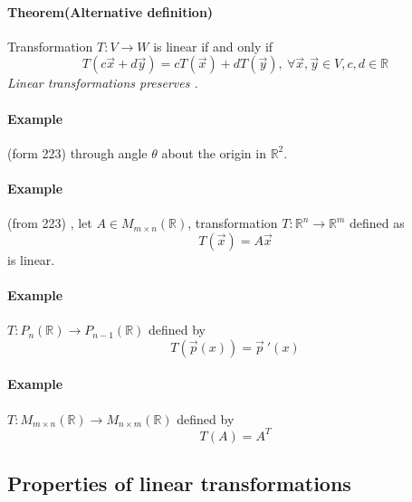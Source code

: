 \documentclass[11pt]{article}
\begin{document}
	\paragraph{Theorem(Alternative definition)} Transformation $T: V \to W$ is linear if and only if 
	\[
		T(c\vec{x} + d\vec{y}) = cT(\vec{x}) + dT(\vec{y}),\ \forall \vec{x},\vec{y} \in V, c,d \in \mathbb{R} 
	\]
	\emph{Linear transformations preserves .}
	
	\paragraph{Example}(form 223)  through angle $\theta$ about the origin in $\mathbb{R}^2$.
	\paragraph{Example}(from 223) , let $A \in M_{m \times n}(\mathbb{R})$, transformation $T: \mathbb{R}^n \to \mathbb{R}^m$ defined as 
	\[
		T(\vec{x}) = A \vec{x}
	\]
	is linear.
	\paragraph{Example}  $T: P_n(\mathbb{R}) \to P_{n-1}(\mathbb{R})$ defined by
	\[
		T(\vec{p}(x)) = \vec{p}\ '(x)
	\]
	\paragraph{Example}  $T:M_{m \times n}(\mathbb{R}) \to M_{n \times m}(\mathbb{R})$ defined by
	\[
		T(A) = A^T
	\]
	\subsection{Properties of linear transformations}
\end{document}
